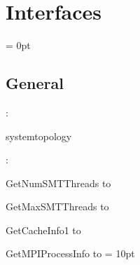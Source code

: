 
\section{Interfaces} 


\parskip = 0pt

\vspace{3mm} \subsection*{General}

: 

systemtopology
\vspace{2mm}

\vspace{5mm}

: 



GetNumSMTThreads to 

GetMaxSMTThreads to 

GetCacheInfo1 to 

GetMPIProcessInfo to 
\vspace{2mm}\parskip = 10pt 
